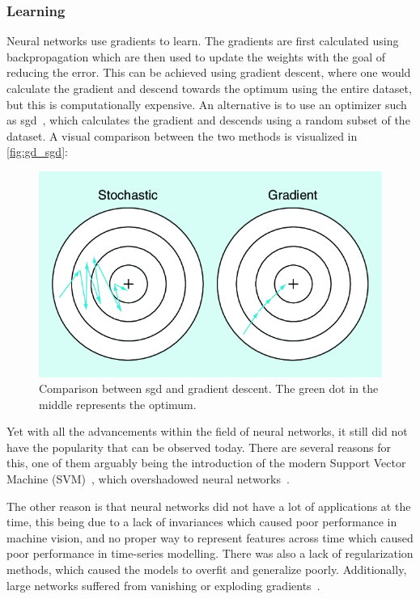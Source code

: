 \subsubsection{Learning}
Neural networks use gradients to learn. The gradients are first calculated using backpropagation which are then used to update the weights with the goal of reducing the error. This can be achieved using gradient descent, where one would calculate the gradient and descend towards the optimum using the entire dataset, but this is computationally expensive. An alternative is to use an optimizer such as \gls*{sgd}~\cite{sgd}, which calculates the gradient and descends using a random subset of the dataset. A visual comparison between the two methods is visualized in \autoref{fig:gd_sgd}:
\begin{figure}[H]
    \centering
    \includegraphics[width=0.8\linewidth]{resources/related_works/gradient_descent}
    \caption[Gradient Descent Comparison]{Comparison between \gls*{sgd} and gradient descent. The green dot in the middle represents the optimum.}
    \label{fig:gd_sgd}
\end{figure}
\par
Yet with all the advancements within the field of neural networks, it still did not have the popularity that can be observed today. There are several reasons for this, one of them arguably being the introduction of the modern Support Vector Machine (SVM)~\cite{svm}, which overshadowed neural networks~\cite{kuncheva2019pattern}.
\par
The other reason is that neural networks did not have a lot of applications at the time, this being due to a lack of invariances which caused poor performance in machine vision, and no proper way to represent features across time which caused poor performance in time-series modelling. There was also a lack of regularization methods, which caused the models to overfit and generalize poorly. Additionally, large networks suffered from vanishing or exploding gradients~\cite{exploding_vanishing_gradients}.
